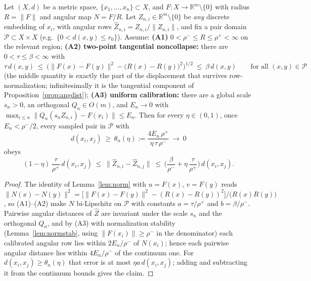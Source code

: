 \documentclass[review]{siamart220329}
\begin{document}
\begin{theorem}\label{thm:transfer}
Let $(X,d)$ be a metric space, $\{x_1,\dots,x_n\}\subset X$, and
$F:X\to\mathbb R^m\setminus\{0\}$ with radius $R=\lVert F\rVert$ and angular map
$N=F/R$. Let $Z_{n,i}\in\mathbb R^m\setminus\{0\}$ be \emph{any} discrete
embedding of $x_i$, with angular rows
$\hat Z_{n,i}=Z_{n,i}/\lVert Z_{n,i}\rVert$, and fix a pair domain
$\mathcal P\subset X\times X$ (e.g.\ $\{0<d(x,y)\le r_0\}$). Assume:
\textbf{(A1)} $0<\rho^-\le R\le\rho^+<\infty$ on the relevant region;
\textbf{(A2) two-point tangential noncollapse:} there are
$0<\tau\le\beta<\infty$ with
\[
\tau\,d(x,y)\ \le\
\Big(\lVert F(x)-F(y)\rVert^2-\big(R(x)-R(y)\big)^2\Big)^{1/2}
\ \le\ \beta\,d(x,y)
\qquad\text{for all }(x,y)\in\mathcal P
\]
(the middle quantity is exactly the part of the displacement that survives
row-normalization; infinitesimally it is the tangential component of
Proposition~\ref{prop:angdist});
\textbf{(A3) uniform calibration:} there are a global scale $s_n>0$, an
orthogonal $Q_n\in O(m)$, and $E_n\to0$ with
$\max_{i\le n}\lVert Q_n(s_nZ_{n,i})-F(x_i)\rVert\le E_n$.
Then for every $\eta\in(0,1)$, once $E_n<\rho^-/2$, every sampled pair in
$\mathcal P$ with
\[
d(x_i,x_j)\ \ge\ \theta_n(\eta):=\frac{4E_n\,\rho^+}{\eta\,\tau\,\rho^-}
\ \longrightarrow\ 0
\]
obeys
\[
(1-\eta)\,\frac{\tau}{\rho^+}\,d(x_i,x_j)
\ \le\ \lVert\hat Z_{n,i}-\hat Z_{n,j}\rVert
\ \le\ \Big(\frac{\beta}{\rho^-}+\eta\,\frac{\tau}{\rho^+}\Big)\,d(x_i,x_j).
\]
\end{theorem}

\begin{proof}
The identity of Lemma~\ref{lem:norm} with $u=F(x)$, $v=F(y)$ reads
$\lVert N(x)-N(y)\rVert^2=\big[\lVert F(x)-F(y)\rVert^2-(R(x)-R(y))^2\big]
/\big(R(x)R(y)\big)$, so (A1)--(A2) make $N$ bi-Lipschitz on $\mathcal P$ with
constants $a=\tau/\rho^+$ and $b=\beta/\rho^-$. Pairwise angular distances of
$\hat Z$ are invariant under the scale $s_n$ and the orthogonal $Q_n$, and by
(A3) with normalization stability (Lemma~\ref{lem:normstab}, using
$\lVert F(x_i)\rVert\ge\rho^-$ in the denominator) each calibrated angular row
lies within $2E_n/\rho^-$ of $N(x_i)$; hence each pairwise angular distance
lies within $4E_n/\rho^-$ of the continuum one. For
$d(x_i,x_j)\ge\theta_n(\eta)$ that error is at most $\eta a\,d(x_i,x_j)$;
adding and subtracting it from the continuum bounds gives the claim.
\end{proof}
\end{document}
